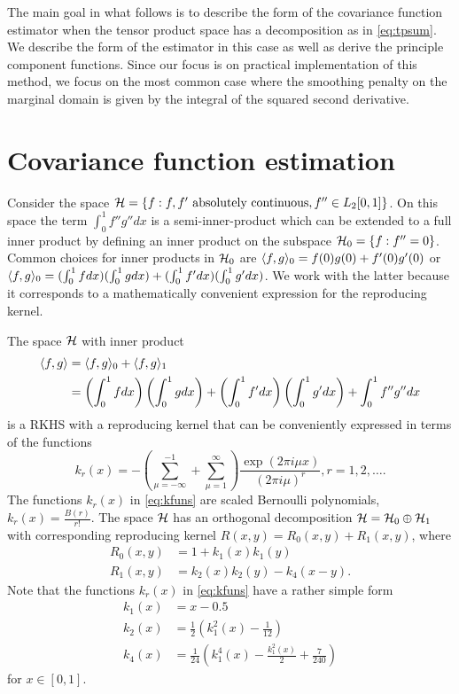 The main goal in what follows is to describe the form of the covariance function estimator when the tensor product space has a decomposition as in \eqref{eq:tpsum}. We describe the form of the estimator in this case as well as derive the principle component functions. Since our focus is on practical implementation of this method, we focus on the most common case where the smoothing penalty on the marginal domain is given by the integral of the squared second derivative.

\section{Covariance function estimation} 

\label{sec:covariance_function_estimation}

Consider the space $\mathcal{H} = \{f : f, f' \mbox{ absolutely continuous}, f'' \in L_2[0,1]\}$. On this space the term $\int_0^1 f''g''dx$ is a semi-inner-product which can be extended to a full inner product by defining an inner product on the subspace $\mathcal{H}_0 = \{f : f'' = 0\}$. Common choices for inner products in $\mathcal{H}_0$ are $\langle f, g \rangle_0 = f(0)g(0) + f'(0)g'(0)$ or $\langle f, g \rangle_0 = (\int_0^1fdx)(\int_0^1gdx) + (\int_0^1f'dx)(\int_0^1g'dx)$. We work with the latter because it corresponds to a mathematically convenient expression for the reproducing kernel. 

The space $\mathcal{H}$ with inner product 
\begin{align*}
	\langle f, g \rangle &= \langle f, g \rangle_0 + \langle f, g \rangle_1 \\
	&= \left(\int_0^1fdx\right)\left(\int_0^1gdx\right) + \left(\int_0^1f'dx\right)\left(\int_0^1g'dx\right) + \int_0^1 f''g''dx 
\end{align*}
is a RKHS with a reproducing kernel that can be conveniently expressed in terms of the functions 
\begin{equation}
	k_r(x) = -\left( \sum_{\mu = -\infty}^{-1} + \sum_{\mu=1}^{\infty} \right) \frac{\exp(2\pi i \mu x)}{(2 \pi i \mu)^r}, r = 1,2, \dots. \label{eq:kfuns} 
\end{equation}
The functions $k_r(x)$ in \eqref{eq:kfuns} are scaled Bernoulli polynomials, $k_r(x) = \frac{B(r)}{r!}$. The space $\mathcal{H}$ has an orthogonal decomposition $\mathcal{H} = \mathcal{H}_0 \oplus \mathcal{H}_1$ with corresponding reproducing kernel $R(x,y) = R_0(x,y) + R_1(x,y)$, where 
\begin{align}
	R_0(x,y) &= 1 + k_1(x)k_1(y) \\
	R_1(x,y) &= k_2(x)k_2(y) - k_4(x-y). 
\end{align}
Note that the functions $k_r(x)$ in \eqref{eq:kfuns} have a rather simple form 
\begin{align*}
	k_1(x) &= x - 0.5\\
	k_2(x) &= \frac{1}{2}(k_1^2(x) - \frac{1}{12}) \\
	k_4(x) &= \frac{1}{24} \left(k_1^4(x) - \frac{k_1^2(x)}{2} + \frac{7}{240} \right) 
\end{align*}
for $x \in [0,1]$. 

